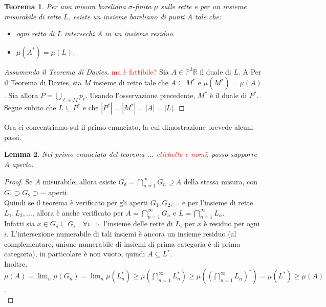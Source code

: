 \documentclass[a4paper, twoside,openright]{article}
\newcommand{\Ra}{\Rightarrow}
\newcommand{\R}{\mathbb{R}}
\renewcommand{\P}{\mathbb{P}}
\newcommand{\fa}{\forall}
\newcommand{\<}{\langle}
\renewcommand{\>}{\rangle}
\newtheorem{teo}{Teorema}[]
\newtheorem{lemma}[teo]{Lemma}
\begin{document}
\begin{teo}
	Per una misura boreliana $\sigma$-finita $\mu$ sulle rette e per un insieme misurabile di rette $L$, esiste un insieme boreliano di punti $A$ tale che:
	\begin{itemize}
		\item ogni retta di $L$ intersechi $A$ in un insieme residuo.
		\item $\mu\left(A^{*}\right)=\mu(L)$.
	\end{itemize}
\end{teo}

\begin{proof}[Assumendo il Teorema di Davies]
	\textcolor{red}{ma è fattibile?}
	Sia $A \in \P^2\R$ il duale di $L$. A  Per il Teorema di Davies, sia $M$ insieme di rette tale che $A \subseteq M^*$ e $\mu(M^*)=\mu(A)$. Sia allora $P = \bigcup_{\ell\in M}p_\ell$. Usando l'osservazione precedente, $M^*$ è il duale di $P^*$. Segue subito che $L \subseteq P^*$ e che $|P^*|=|M^*|=|A|=|L|$.
\end{proof}

Ora ci concentriamo sul il primo enunciato, la cui dimostrazione prevede alcuni passi.

\begin{lemma}
	Nel primo enunciato del teorema ... \textcolor{red}{etichette e nomi}, posso supporre $A$ aperto.
\end{lemma}

\begin{proof}
	Se $A$ misurabile, allora esiste $G_{\delta} = \bigcap_{n=1}^{\infty} G_{n} \supseteq A$ della stessa misura, con $G_{1} \supset G_{2} \supset \cdots$ aperti.\\
	Quindi se il teorema è verificato per gli aperti $G_{1}, G_{2}, \ldots$ e per l'insieme di rette $L_{1}, L_{2}, \ldots$, allora è anche verificato per  $A=\bigcap_{n=1}^{\infty} G_{n}$ e $L=\bigcap_{n=1}^{\infty} L_{n}$.\\
	Infatti sia $x \in G_{\delta} \subseteq G_i \quad \fa i \Ra$ l'insieme delle rette di $L_i$ per $x$ è residuo per ogni $i$. L'intersezione numerabile di tali insiemi è ancora un insieme residuo (al complementare, unione numerabile di insiemi di prima categoria è di prima categoria), in particolare è non vuoto, quindi $A \subseteq L^*$.\\
	Inoltre, $\mu(A) = \lim_n \mu(G_n) = \lim_n \mu(L_n^*) \geq \mu\left(\bigcap_{n=1}^\infty L_n^*\right) \geq \mu\left(\left(\bigcap_{n=1}^\infty L_n\right)^*\right) = \mu(L^*) \geq \mu(A)$.	\\
\end{proof}
\end{document}
